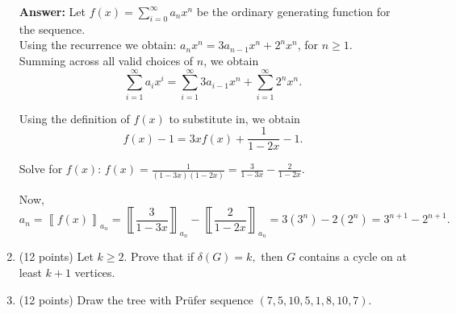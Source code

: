 \documentclass[11pt]{article}
\def\ldb{\llbracket}
\def\rdb{\rrbracket}
\begin{document}
\begin{enumerate}
\textbf{Answer:} Let $\displaystyle{f(x)=\sum_{i=0}^\infty a_nx^n}$ be the ordinary generating function for the sequence. \\

Using the recurrence we obtain: $a_nx^n=3a_{n-1}x^n+2^nx^n$, for $n \geq 1.$\\

Summing across all valid choices of $n$, we obtain $$\displaystyle{\sum_{i=1}^\infty a_ix^i=\sum_{i=1}^\infty 3a_{i-1}x^n+\sum_{i=1}^\infty 2^nx^n.}$$

Using the definition of $f(x)$ to substitute in, we obtain
$$\displaystyle{f(x)-1=3xf(x)+\frac{1}{1-2x}-1.}$$

Solve for $f(x)$: $\displaystyle{f(x)=\frac{1}{(1-3x)(1-2x)} = \frac{3}{1-3x}-\frac{2}{1-2x}}.$

Now, 
$$a_n=\left\ldb f(x) \right\rdb_{a_n}=\left\ldb  \frac{3}{1-3x} \right\rdb_{a_n}-\left\ldb\frac{2}{1-2x} \right\rdb_{a_n}=3(3^n)-2(2^n)=3^{n+1}-2^{n+1}.$$

\vfill
\item (12 points) Let $k\geq 2.$ Prove that if $\delta(G)=k,$ then $G$ contains a cycle on at least $k+1$ vertices.\\


\vfill

\item (12 points) Draw the tree with Pr\"{u}fer sequence $(7,5,10,5,1,8,10,7).$


\end{enumerate}
\end{document}
